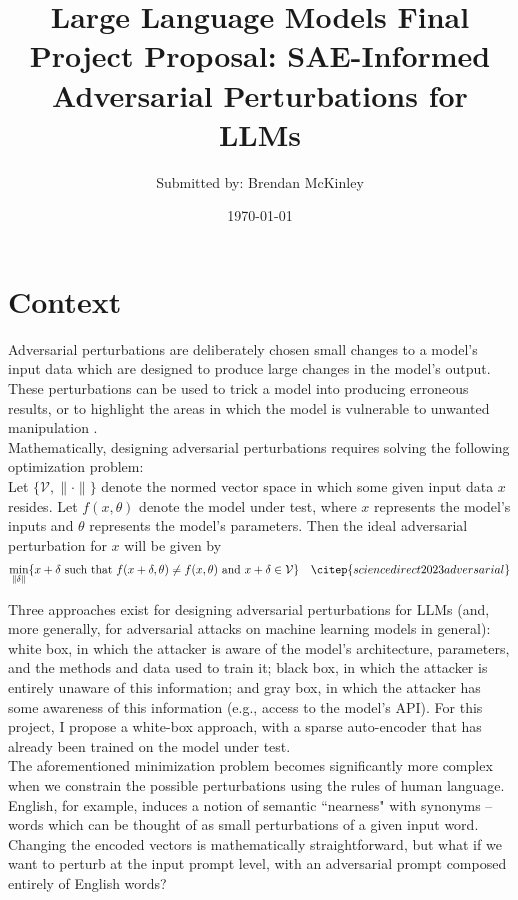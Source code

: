 \documentclass{article}
\title{Large Language Models Final Project Proposal: SAE-Informed Adversarial Perturbations for LLMs}
\author{Submitted by: Brendan McKinley}
\date\today
\begin{document}
\maketitle 

\section*{Context}

Adversarial perturbations are deliberately chosen small changes to a model's input data which are designed to produce large changes in the model's output. These perturbations can be used to trick a model into producing erroneous results, or to highlight the areas in which the model is vulnerable to unwanted manipulation \citep{youtube2024video} \citep{adversarialrobustness2024}.\\ 

Mathematically, designing adversarial perturbations requires solving the following optimization problem:\\

Let $\{\mathcal{V}, \lVert \cdot \rVert\}$ denote the normed vector space in which some given input data $x$ resides. Let $f(x, \theta)$ denote the model under test, where $x$ represents the model's inputs and $\theta$ represents the model's parameters. Then the ideal adversarial perturbation for $x$ will be given by
\begin{align*}
\min\limits_{\lVert \delta \rVert}\{x + \delta \text{ such that } f(x + \delta, \theta) \ne f(x, \theta) \text{ and } x + \delta \in \mathcal{V}\} && \citep{sciencedirect2023adversarial}
\end{align*}

Three approaches exist for designing adversarial perturbations for LLMs (and, more generally, for adversarial attacks on machine learning models in general): white box, in which the attacker is aware of the model's architecture, parameters, and the methods and data used to train it; black box, in which the attacker is entirely unaware of this information; and gray box, in which the attacker has some awareness of this information (e.g., access to the model's API). For this project, I propose a white-box approach, with a sparse auto-encoder that has already been trained on the model under test.\\

The aforementioned minimization problem becomes significantly more complex when we constrain the possible perturbations using the rules of human language. English, for example, induces a notion of semantic ``nearness" with synonyms -- words which can be thought of as small perturbations of a given input word. Changing the encoded vectors is mathematically straightforward, but what if we want to perturb at the input prompt level, with an adversarial prompt composed entirely of English words? \\
\end{document}
